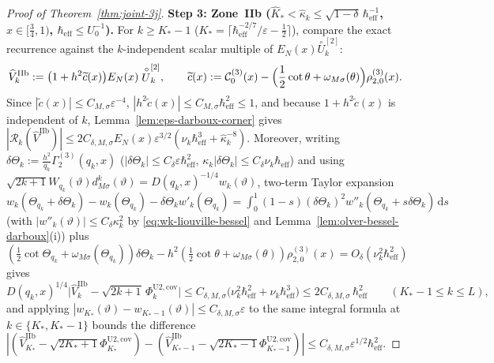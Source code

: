 \documentclass[11pt]{article}
\theoremstyle{definition}
\theoremstyle{remark}
\newcommand{\dd}{\mathrm{d}}
\newcommand{\cC}{\mathcal{C}}
\newcommand{\cR}{\mathcal{R}}
\newcommand{\heff}{\hbar_{\mathrm{eff}}}
\renewcommand{\_}{\oldunderscore\penalty0\hskip0pt\relax}
\begin{document}
\begin{proof}[Proof of Theorem~\ref{thm:joint-3j}]
\medskip
\noindent\textbf{Step 3: Zone~IIb ($\hat{K}_*<\hat{\kappa}_k\le\sqrt{1-\delta}\,\heff^{-1}$, $x\in[\frac34,1)$, $\heff\le U_0^{-1}$).}
For $k\ge K_*-1$ ($K_*=\lceil\heff^{-2/7}/\varepsilon-\frac12\rceil$), compare the exact recurrence against the $k$-independent
  scalar multiple of $E_N(x)\stackrel{\circ}{U}_k^{[2]}$:
\begin{equation}
  \widehat{V}_k^{\mathrm{IIb}} := \bigl(1 + h^2\widetilde{c}(x)\bigr)E_N(x)\stackrel{\circ}{U}_k^{[2]},\qquad
  \widetilde{c}(x) := \cC_0^{(3)}(x) - \Bigl(\frac12\cot\theta + \omega_{M\sigma}(\theta)\Bigr)\rho_{2,0}^{(3)}(x).
\end{equation}
Since $|\widetilde{c}(x)|\le C_{M,\sigma}\varepsilon^{-4}$, $|h^2\widetilde{c}(x)|\le C_{M,\sigma}\heff^2\le 1$, and because
  $1+h^2\widetilde{c}(x)$ is independent of $k$, Lemma~\ref{lem:eps-darboux-corner} gives $|\cR_k(\widehat{V}^{\mathrm{IIb}})|\le
  2C_{\delta,M,\sigma}E_N(x)\varepsilon^{3/2}(\nu_k\heff^3+\hat{\kappa}_k^{-8})$. Moreover, writing
  $\delta\Theta_k:=\frac{h^2}{q_k}\Gamma_2^{(3)}(q_k,x)$ ($|\delta\Theta_k|\le C_\delta\varepsilon\heff^2$,
  $\kappa_k|\delta\Theta_k|\le C_\delta\nu_k\heff$) and using
  $\sqrt{2k+1}W_{q_k}(\vartheta)d^k_{M\sigma}(\vartheta)=D(q_k,x)^{-1/4}w_k(\vartheta)$, two-term Taylor expansion
  $w_k(\Theta_{q_k}+\delta\Theta_k)-w_k(\Theta_{q_k})-\delta\Theta_k w'_k(\Theta_{q_k})=\int_0^1(1-s)(\delta\Theta_k)^2
  w''_k(\Theta_{q_k}+s\delta\Theta_k)\,\dd s$ (with $|w''_k(\vartheta)|\le C_\delta\kappa_k^2$ by \eqref{eq:wk-liouville-bessel}
  and Lemma~\ref{lem:olver-bessel-darboux}(i)) plus
  $(\frac12\cot\Theta_{q_k}+\omega_{M\sigma}(\Theta_{q_k}))\delta\Theta_k-h^2(\frac12\cot\theta+\omega_{M\sigma}(\theta))\rho_{2,0}^{(3)}(x)=O_\delta(\nu_k^2\heff^2)$
  gives
\begin{equation}
  D(q_k,x)^{1/4}\bigl|\widehat{V}_k^{\mathrm{IIb}} - \sqrt{2k+1}\,\Phi_k^{\mathrm{U2,cov}}\bigr| \le
    C_{\delta,M,\sigma}\bigl(\nu_k^2\heff^2 + \nu_k\heff^3\bigr) \le 2C_{\delta,M,\sigma}\,\heff^2\qquad (K_*-1\le k\le L),
  \label{eq:pointwise-V-U2cov}
\end{equation}
and applying $|w_{K_*}(\vartheta)-w_{K_*-1}(\vartheta)|\le C_{\delta,M,\sigma}\varepsilon$ to the same integral formula at
  $k\in\{K_*,K_*-1\}$ bounds the difference
  $|(\widehat{V}_{K_*}^{\mathrm{IIb}}-\sqrt{2K_*+1}\Phi_{K_*}^{\mathrm{U2,cov}})-(\widehat{V}_{K_*-1}^{\mathrm{IIb}}-\sqrt{2K_*-1}\Phi_{K_*-1}^{\mathrm{U2,cov}})|\le
  C_{\delta,M,\sigma}\varepsilon^{1/2}\heff^2$.


\end{proof}
\end{document}
